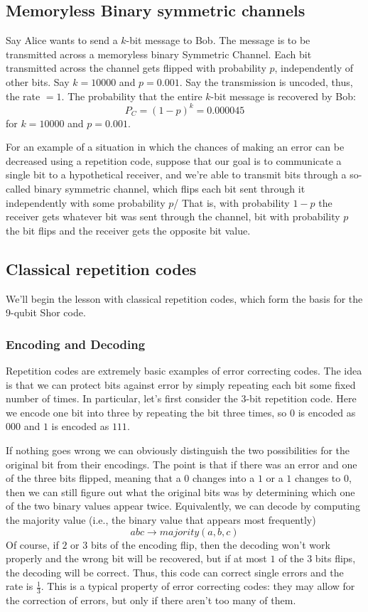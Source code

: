 \documentclass[12pt, oneside]{book}
\theoremstyle{definition}
\theoremstyle{definition}
\theoremstyle{remark}
\begin{document}
\subsection{Memoryless Binary symmetric channels}
Say Alice wants to send a $k$-bit message to Bob. The message is to be transmitted across a memoryless binary Symmetric Channel. Each bit transmitted across the channel gets flipped with probability $p$, independently of other bits. Say $k=10000$ and $p=0.001$. Say the transmission is uncoded, thus, the rate $=1$. The probability that the entire $k$-bit message is recovered by Bob:
\[
P_C=(1-p)^k=0.000045
\]
for $k=10000$ and $p=0.001$.

For an example of a situation in which the chances of making an error can be decreased using a repetition code, suppose that our goal is to communicate a single bit to a hypothetical receiver, and we're able to transmit bits through a so-called binary symmetric channel, which flips each bit sent through it independently with some probability $p$/ That is, with probability $1-p$ the receiver gets whatever bit was sent through the channel, bit with probability $p$ the bit flips and the receiver gets the opposite bit value.
\subsection{Classical repetition codes}
We'll begin the lesson with classical repetition codes, which form the basis for the 9-qubit Shor code.


\subsubsection{Encoding and Decoding}
Repetition codes are extremely basic examples of error correcting codes. The idea is that we can protect bits against error by simply repeating each bit some fixed number of times. In particular, let's first consider the $3$-bit repetition code. Here we encode one bit into three by repeating the bit three times, so $0$ is encoded as $000$ and $1$ is encoded as $111$.

If nothing goes wrong we can obviously distinguish the two possibilities for the original bit from their encodings. The point is that if there was an error and one of the three bits flipped, meaning that a $0$ changes into a $1$ or a $1$ changes to $0$, then we can still figure out what the original bits was by determining which one of the two binary values appear twice. Equivalently, we can decode by computing the majority value (i.e., the binary value that appears most frequently)
\[
abc \rightarrow majority(a,b,c)
\]
Of course, if $2$ or $3$ bits of the encoding flip, then the decoding won't work properly and the wrong bit will be recovered, but if at most $1$ of the $3$ bits flips, the decoding will be correct. Thus, this code can correct single errors and the rate is $\frac{1}{3}$. This is a typical property of error correcting codes: they may allow for the correction of errors, but only if there aren't too many of them.
\end{document}
